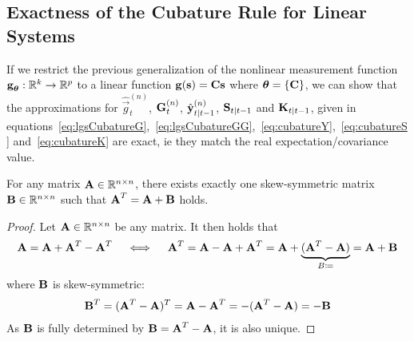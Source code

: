 	\subsection{Exactness of the Cubature Rule for Linear Systems}
		If we restrict the previous generalization of the nonlinear measurement function \( \boldsymbol{\mathrm{g}}_{\boldsymbol{\mathrm{\theta}}} : \mathbb{R}^k \to \mathbb{R}^p \) to a linear function \( \boldsymbol{\mathrm{g}}(\boldsymbol{\mathrm{s}}) = \boldsymbol{\mathrm{C}} \boldsymbol{\mathrm{s}} \) where \( \boldsymbol{\mathrm{\theta}} = \{ \boldsymbol{\mathrm{C}} \} \), we can show that the approximations for \( \hat{\vec{g}}_t^{(n)} \), \( \boldsymbol{\mathrm{G}}_t^{(n)} \), \( \hat{\boldsymbol{\mathrm{y}}}_{t \vert t - 1}^{(n)} \), \( \boldsymbol{\mathrm{S}}_{t \vert t - 1} \) and \( \boldsymbol{\mathrm{K}}_{t \vert t - 1} \), given in equations~\eqref{eq:lgsCubatureG},~\eqref{eq:lgsCubatureGG},~\eqref{eq:cubatureY},~\eqref{eq:cubatureS} and~\eqref{eq:cubatureK} are exact, \ac{ie} they match the real expectation/covariance value.

		\begin{lemma}
			For any matrix \( \boldsymbol{\mathrm{A}} \in \mathbb{R}^{n \times n} \), there exists exactly one skew-symmetric matrix \( \boldsymbol{\mathrm{B}} \in \mathbb{R}^{n \times n} \) such that \( \boldsymbol{\mathrm{A}}^T = \boldsymbol{\mathrm{A}} + \boldsymbol{\mathrm{B}} \) holds.
		\end{lemma}
		\begin{proof}
			Let \( \boldsymbol{\mathrm{A}} \in \mathbb{R}^{n \times n} \) be any matrix. It then holds that
			\begin{align*}
				\boldsymbol{\mathrm{A}} = \boldsymbol{\mathrm{A}} + \boldsymbol{\mathrm{A}}^T - \boldsymbol{\mathrm{A}}^T \quad\iff\quad \boldsymbol{\mathrm{A}}^T = \boldsymbol{\mathrm{A}} - \boldsymbol{\mathrm{A}} + \boldsymbol{\mathrm{A}}^T = \boldsymbol{\mathrm{A}} + \underbrace{(\boldsymbol{\mathrm{A}}^T - \boldsymbol{\mathrm{A}})}_{B \coloneqq} = \boldsymbol{\mathrm{A}} + \boldsymbol{\mathrm{B}}
			\end{align*}
			where \( \boldsymbol{\mathrm{B}} \) is skew-symmetric:
			\begin{align*}
				\boldsymbol{\mathrm{B}}^T = (\boldsymbol{\mathrm{A}}^T - \boldsymbol{\mathrm{A}})^T = \boldsymbol{\mathrm{A}} - \boldsymbol{\mathrm{A}}^T = -(\boldsymbol{\mathrm{A}}^T - \boldsymbol{\mathrm{A}}) = -\boldsymbol{\mathrm{B}}
			\end{align*}
			As \(\boldsymbol{\mathrm{B}}\) is fully determined by \( \boldsymbol{\mathrm{B}} = \boldsymbol{\mathrm{A}}^T - \boldsymbol{\mathrm{A}} \), it is also unique.
		\end{proof}

